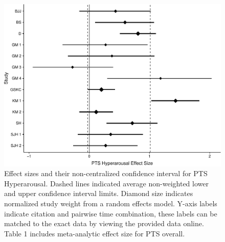 \documentclass[,man]{apa6}
\begin{document}
\begin{figure}
\centering
\includegraphics{meta_markdown_files/figure-latex/ptspichyper-1.pdf}
\caption{\label{fig:ptspichyper}Effect sizes and their non-centralized confidence interval for PTS Hyperarousal. Dashed lines indicated average non-weighted lower and upper confidence interval limits. Diamond size indicates normalized study weight from a random effects model. Y-axis labels indicate citation and pairwise time combination, these labels can be matched to the exact data by viewing the provided data online. Table 1 includes meta-analytic effect size for PTS overall.}
\end{figure}
\end{document}
